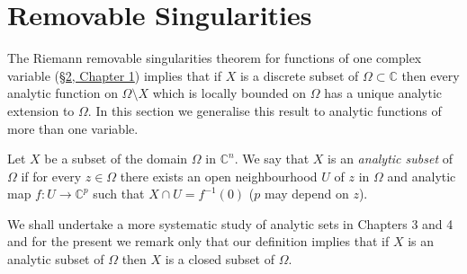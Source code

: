 \section{Removable Singularities}\label{sec:2:2}
The Riemann removable singularities theorem for functions of one complex variable (\hyperref[sec:1:2]{\S2, Chapter 1}) implies that if $X$ is a discrete subset of $\Omega\subset\mathbb C$ then every analytic function on $\Omega\setminus X$ which is locally bounded on $\Omega$ has a unique analytic extension to $\Omega$. In this section we generalise this result to analytic functions of more than one variable.

 Let $X$ be a subset of the domain $\Omega$ in $\mathbb C^n$. We say that $X$ is an \emph{analytic subset} of $\Omega$ if for every $z\in\Omega$ there exists an open neighbourhood $U$ of $z$ in $\Omega$ and analytic map $f:U\to\mathbb C^p$ such that $X\cap U=f^{-1}(0)$ ($p$ may depend on $z$).

We shall undertake a more systematic study of analytic sets in Chapters 3 and 4 and for the present we remark only that our definition implies that if $X$ is an analytic subset of $\Omega$ then $X$ is a closed subset of $\Omega$.

